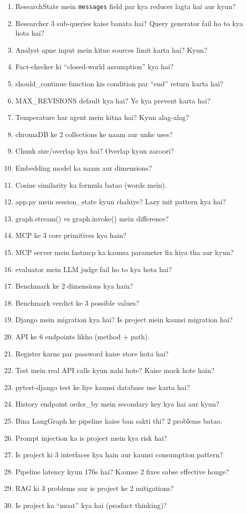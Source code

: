 \begin{enumerate}[label=\arabic*.]
\item ResearchState mein \texttt{messages} field par kya reducer lagta hai aur kyun?
\item Researcher 3 sub-queries kaise banata hai? Query generator fail ho to kya hota hai?
\item Analyst apne input mein kitne sources limit karta hai? Kyun?
\item Fact-checker ki ``closed-world assumption'' kya hai?
\item should\_continue function kis condition par ``end'' return karta hai?
\item MAX\_REVISIONS default kya hai? Ye kya prevent karta hai?
\item Temperature har agent mein kitna hai? Kyun alag-alag?
\item chromaDB ke 2 collections ke naam aur unke uses?
\item Chunk size/overlap kya hai? Overlap kyun zaroori?
\item Embedding model ka naam aur dimensions?
\item Cosine similarity ka formula batao (words mein).
\item app.py mein session\_state kyun chahiye? Lazy init pattern kya hai?
\item graph.stream() vs graph.invoke() mein difference?
\item MCP ke 3 core primitives kya hain?
\item MCP server mein fastmcp ka kaunsa parameter fix kiya tha aur kyun?
\item evaluator mein LLM judge fail ho to kya hota hai?
\item Benchmark ke 2 dimensions kya hain?
\item Benchmark verdict ke 3 possible values?
\item Django mein migration kya hai? Is project mein kaunsi migration hai?
\item API ke 6 endpoints likho (method + path).
\item Register karne par password kaise store hota hai?
\item Test mein real API calls kyun nahi hote? Kaise mock hote hain?
\item pytest-django test ke liye kaunsi database use karta hai?
\item History endpoint order\_by mein secondary key kya hai aur kyun?
\item Bina LangGraph ke pipeline kaise ban sakti thi? 2 problems batao.
\item Prompt injection ka is project mein kya risk hai?
\item Is project ki 3 interfaces kya hain aur kaunsi consumption pattern?
\item Pipeline latency kyun 176s hai? Kaunse 2 fixes sabse effective honge?
\item RAG ki 3 problems aur is project ke 2 mitigations?
\item Is project ka ``moat'' kya hai (product thinking)?
\end{enumerate}

